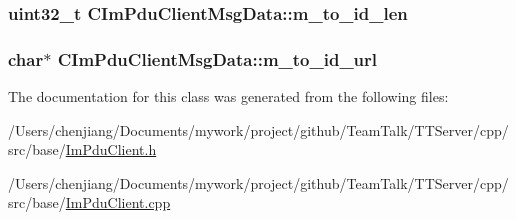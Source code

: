 \subsubsection[{m\+\_\+to\+\_\+id\+\_\+len}]{\setlength{\rightskip}{0pt plus 5cm}uint32\+\_\+t C\+Im\+Pdu\+Client\+Msg\+Data\+::m\+\_\+to\+\_\+id\+\_\+len\hspace{0.3cm}{\ttfamily [private]}}\label{class_c_im_pdu_client_msg_data_a47d7a192cc2705e5a15e8ba08715cf27}
\hypertarget{class_c_im_pdu_client_msg_data_a59bcf473a08e7ed29909f3590228d82d}{}
\subsubsection[{m\+\_\+to\+\_\+id\+\_\+url}]{\setlength{\rightskip}{0pt plus 5cm}char$\ast$ C\+Im\+Pdu\+Client\+Msg\+Data\+::m\+\_\+to\+\_\+id\+\_\+url\hspace{0.3cm}{\ttfamily [private]}}\label{class_c_im_pdu_client_msg_data_a59bcf473a08e7ed29909f3590228d82d}


The documentation for this class was generated from the following files\+:\begin{DoxyCompactItemize}
\item 
/\+Users/chenjiang/\+Documents/mywork/project/github/\+Team\+Talk/\+T\+T\+Server/cpp/src/base/\hyperlink{_im_pdu_client_8h}{Im\+Pdu\+Client.\+h}\item 
/\+Users/chenjiang/\+Documents/mywork/project/github/\+Team\+Talk/\+T\+T\+Server/cpp/src/base/\hyperlink{_im_pdu_client_8cpp}{Im\+Pdu\+Client.\+cpp}\end{DoxyCompactItemize}
